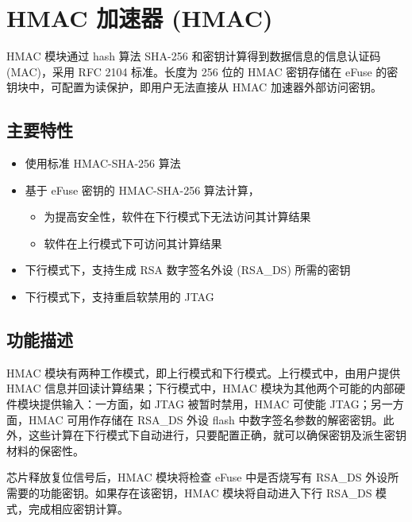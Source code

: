 \documentclass[main\_\_CN.tex]{subfiles}
\begin{document}

\ifglobal
\else
    {\let\clearpage\relax \listoftodos}
    {\let\clearpage\relax \listofdonetodos}
    \tableofcontents
\fi



\chapter{HMAC 加速器 (HMAC)}
\label{mod:hmac}
\hypertarget{hmac}{}

HMAC 模块通过 hash 算法 SHA-256 和密钥计算得到数据信息的信息认证码 (MAC)，采用 RFC 2104 标准。长度为 256 位的 HMAC 密钥存储在 eFuse 的密钥块中，可配置为读保护，即用户无法直接从 HMAC 加速器外部访问密钥。

\section{主要特性}
\begin{itemize}
    \item 使用标准 HMAC-SHA-256 算法
    \item 基于 eFuse 密钥的 HMAC-SHA-256 算法计算，
    \begin{itemize}
    \item 为提高安全性，软件在下行模式下无法访问其计算结果
    \item 软件在上行模式下可访问其计算结果
    \end{itemize}
    \item 下行模式下，支持生成 RSA 数字签名外设 (RSA\_DS) 所需的密钥
    \item 下行模式下，支持重启软禁用的 JTAG
\end{itemize}


\section{功能描述}
HMAC 模块有两种工作模式，即上行模式和下行模式。上行模式中，由用户提供 HMAC 信息并回读计算结果；下行模式中，HMAC 模块为其他两个可能的内部硬件模块提供输入：一方面，如 JTAG 被暂时禁用，HMAC 可使能 JTAG；另一方面，HMAC 可用作存储在 RSA\_DS 外设 flash 中数字签名参数的解密密钥。此外，这些计算在下行模式下自动进行，只要配置正确，就可以确保密钥及派生密钥材料的保密性。
\begin{tiplisting}
芯片释放复位信号后，HMAC 模块将检查 eFuse 中是否烧写有 RSA\_DS 外设所需要的功能密钥。如果存在该密钥，HMAC 模块将自动进入下行 RSA\_DS 模式，完成相应密钥计算。
\end{tiplisting}
\end{document}
